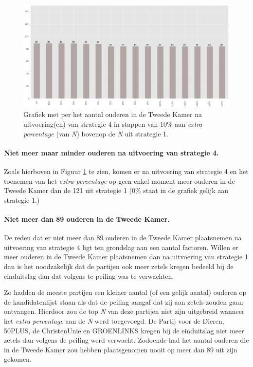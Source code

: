 \begin{figure}[H]

	\includegraphics[width=\linewidth]	{topNextrapercentage_aantal_ouderen_overzicht.png}

			\caption{Grafiek met per het aantal ouderen in de Tweede Kamer na uitvoering(en) van strategie 4 in stappen van 10\% aan \textit{extra percentage} (van \textit{N}) bovenop de \textit{N} uit strategie 1. }

\label{fig:bcS4O}
\end{figure}

\paragraph{Niet meer maar minder ouderen na uitvoering van strategie 4.}
Zoals hierboven in Figuur \ref{fig:bcS4O} te zien, komen er na uitvoering van strategie 4 en het toenemen van het \textit{extra percentage} op geen enkel moment meer ouderen in de Tweede Kamer dan de 121 uit strategie 1 (0\% staat in de grafiek gelijk aan strategie 1.) 


\paragraph{Niet meer dan 89 ouderen in de Tweede Kamer.}
De reden dat er niet meer dan 89 ouderen in de Tweede Kamer plaatsnemen na uitvoering van strategie 4 ligt ten grondslag aan een aantal factoren. Willen er meer ouderen in de Tweede Kamer plaatsnemen dan na uitvoering van strategie 1 dan is het noodzakelijk dat de partijen ook meer zetels kregen bedeeld bij de einduitslag dan dat volgens te peiling was te verwachten. 

Zo hadden de meeste partijen een kleiner aantal (of een gelijk aantal) ouderen op de kandidatenlijst staan als dat de peiling aangaf dat zij aan zetels zouden gaan ontvangen. Hierdoor zou de top \textit{N} van deze partijen niet zijn uitgebreid wanneer het \textit{extra percentage} aan de \textit{N} werd toegevoegd. De Partij voor de Dieren, 50PLUS, de ChristenUnie en GROENLINKS kregen bij de einduitslag niet meer zetels dan volgens de peiling werd verwacht. Zodoende had het aantal ouderen die in de Tweede Kamer zou hebben plaatsgenomen nooit op meer dan 89 uit zijn gekomen.



